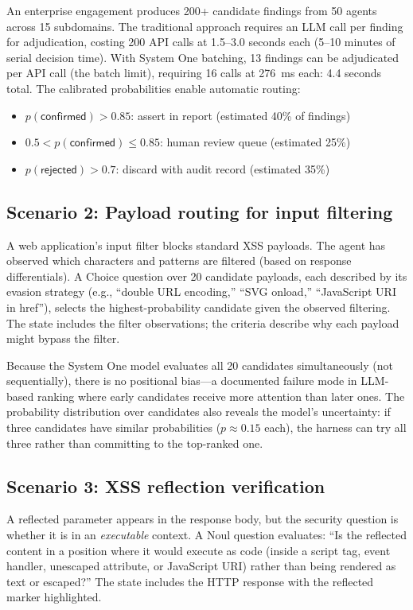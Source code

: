 \documentclass[conference]{IEEEtran}
\begin{document}
An enterprise engagement produces 200+ candidate findings from 50 agents across 15 subdomains. The traditional approach requires an LLM call per finding for adjudication, costing 200 API calls at 1.5--3.0 seconds each (5--10 minutes of serial decision time). With System One batching, 13 findings can be adjudicated per API call (the batch limit), requiring 16 calls at 276~ms each: 4.4 seconds total. The calibrated probabilities enable automatic routing:

\begin{itemize}[leftmargin=*]
\item $p(\textsf{confirmed}) > 0.85$: assert in report (estimated 40\% of findings)
\item $0.5 < p(\textsf{confirmed}) \leq 0.85$: human review queue (estimated 25\%)
\item $p(\textsf{rejected}) > 0.7$: discard with audit record (estimated 35\%)
\end{itemize}

\subsection{Scenario 2: Payload routing for input filtering}

A web application's input filter blocks standard XSS payloads. The agent has observed which characters and patterns are filtered (based on response differentials). A Choice question over 20 candidate payloads, each described by its evasion strategy (e.g., ``double URL encoding,'' ``SVG onload,'' ``JavaScript URI in href''), selects the highest-probability candidate given the observed filtering. The state includes the filter observations; the criteria describe why each payload might bypass the filter.

Because the System One model evaluates all 20 candidates simultaneously (not sequentially), there is no positional bias---a documented failure mode in LLM-based ranking where early candidates receive more attention than later ones. The probability distribution over candidates also reveals the model's uncertainty: if three candidates have similar probabilities ($p \approx 0.15$ each), the harness can try all three rather than committing to the top-ranked one.

\subsection{Scenario 3: XSS reflection verification}

A reflected parameter appears in the response body, but the security question is whether it is in an \emph{executable} context. A Noul question evaluates: ``Is the reflected content in a position where it would execute as code (inside a script tag, event handler, unescaped attribute, or JavaScript URI) rather than being rendered as text or escaped?'' The state includes the HTTP response with the reflected marker highlighted.
\end{document}

